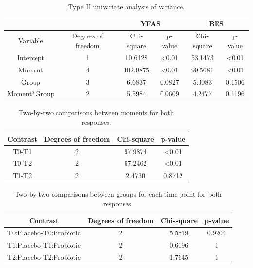 \documentclass[AMA,STIX1COL]{WileyNJD-v2}
\begin{document}
\begin{table}[H]
\centering
\begin{tabular}{c|c|cc|cc}
\hline
              &                    & \multicolumn{2}{c|}{YFAS}     & \multicolumn{2}{c}{BES}       \\ \hline
Variable      & Degrees of freedom & Chi-square   & p-value        & Chi-square   & p-value        \\ \hline
Intercept     & 1                  & 10.6128      & \textless 0.01 & 53.1473      & \textless 0.01 \\
Moment        & 4                  & 102.9875     & \textless 0.01 & 99.5681      & \textless 0.01 \\
Group         & 3                  & 6.6837       & 0.0827         & 5.3083       & 0.1506         \\
Moment*Group  & 2                  & 5.5984       & 0.0609         & 4.2477       & 0.1196         \\ \hline
\end{tabular}
\caption{Type II univariate analysis of variance.}
\label{tab5}
\end{table}


\begin{table}[H]
\centering
\begin{tabular}{cccc}
\hline
Contrast  & Degrees of freedom & Chi-square   & p-value        \\ \hline
T0-T1     & 2                  & 97.9874      & \textless 0.01 \\
T0-T2     & 2                  & 67.2462      & \textless 0.01 \\
T1-T2     & 2                  & 2.4730       & 0.8712         \\ \hline
\end{tabular}
\caption{Two-by-two comparisons between moments for both responses.}
\label{tab6}
\end{table}


\begin{table}[H]
\centering
\begin{tabular}{cccc}
\hline
Contrast                 & Degrees of freedom & Chi-square   & p-value \\ \hline
T0:Placebo-T0:Probiotic  & 2                  & 5.5819       & 0.9204  \\
T1:Placebo-T1:Probiotic  & 2                  & 0.6096       & 1       \\
T2:Placebo-T2:Probiotic  & 2                  & 1.7645       & 1       \\ \hline
\end{tabular}
\caption{Two-by-two comparisons between groups for each time point for both responses.}
\label{tab7}
\end{table}
\end{document}
